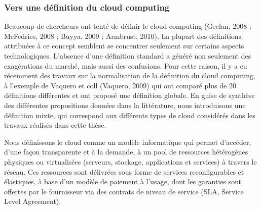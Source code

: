 \subsubsection{Vers une définition du cloud computing }
Beaucoup de chercheurs ont tenté de définir le cloud computing (Geelan, 2008 ; McFedries, 2008 ; Buyya, 2009 ; Armbrust, 2010). La plupart des définitions attribuées à ce concept semblent se concentrer seulement sur certains aspects technologiques. L'absence d'une définition standard a généré non seulement des exagérations du marché, mais aussi des confusions. Pour cette raison, il y a eu récemment des travaux sur la normalisation de la définition du cloud computing, à l'exemple de Vaquero et coll (Vaquero, 2009) qui ont comparé plus de 20 définitions différentes et ont proposé une définition globale.  En guise de synthèse des différentes propositions données dans la littérature, nous introduisons une définition mixte, qui correspond aux différents types de cloud considérés dans les travaux réalisés dans cette thèse.

  Nous définissons le cloud comme un modèle informatique qui permet d’accéder, d’une façon transparente et à la demande, à un pool de ressources hétérogènes physiques ou virtualisées (serveurs, stockage, applications et services) à travers le réseau. Ces ressources sont délivrées sous forme de services reconfigurables et élastiques, à base d’un modèle de paiement à l’usage, dont les garanties sont offertes par le fournisseur via des contrats de niveau de service (SLA, Service Level Agreement).     
    
